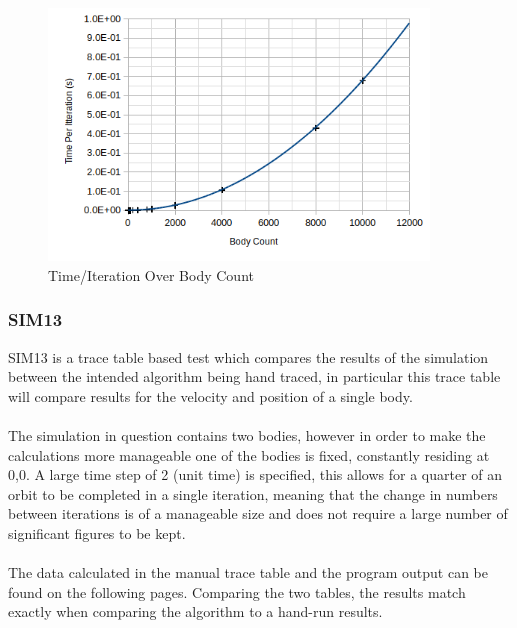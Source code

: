 \begin{figure}[!h]
  \centering
  \includegraphics[width=0.9\textwidth]{img/testingEvidence/perfgraph2.png}
  \caption{Time/Iteration Over Body Count}
\end{figure}

\pagebreak

\subsubsection{SIM13}
SIM13 is a trace table based test which compares the results of the simulation between the intended algorithm being hand traced, in particular this trace table will compare results for the velocity and position of a single body.

\paragraph{}
The simulation in question contains two bodies, however in order to make the calculations more manageable one of the bodies is fixed, constantly residing at 0,0. A large time step of 2 (unit time) is specified, this allows for a quarter of an orbit to be completed in a single iteration, meaning that the change in numbers between iterations is of a manageable size and does not require a large number of significant figures to be kept.

\paragraph{}
The data calculated in the manual trace table and the program output can be found on the following pages. Comparing the two tables, the results match exactly when comparing the algorithm to a hand-run results.

